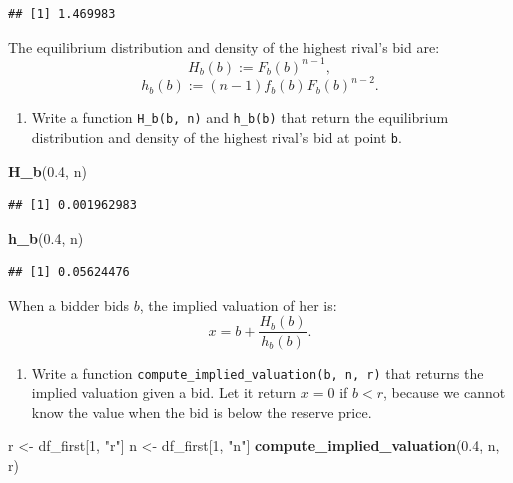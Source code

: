 \documentclass[]{book}
\newenvironment{Shaded}{\begin{snugshade}}{\end{snugshade}}
\newcommand{\KeywordTok}[1]{\textcolor[rgb]{0.13,0.29,0.53}{\textbf{#1}}}
\newcommand{\DecValTok}[1]{\textcolor[rgb]{0.00,0.00,0.81}{#1}}
\newcommand{\FloatTok}[1]{\textcolor[rgb]{0.00,0.00,0.81}{#1}}
\newcommand{\StringTok}[1]{\textcolor[rgb]{0.31,0.60,0.02}{#1}}
\newcommand{\NormalTok}[1]{#1}
\providecommand{\tightlist}{%
  \setlength{\itemsep}{0pt}\setlength{\parskip}{0pt}}
\begin{document}
\begin{verbatim}
## [1] 1.469983
\end{verbatim}

The equilibrium distribution and density of the highest rival's bid are:
\[
H_b(b) := F_b(b)^{n - 1},
\] \[
h_b(b) := (n - 1) f_b(b) F_b(b)^{n - 2}.
\]

\begin{enumerate}
\def\labelenumi{\arabic{enumi}.}
\setcounter{enumi}{10}
\tightlist
\item
  Write a function \texttt{H\_b(b,\ n)} and \texttt{h\_b(b)} that return
  the equilibrium distribution and density of the highest rival's bid at
  point \texttt{b}.
\end{enumerate}

\begin{Shaded}
\begin{Highlighting}[]
\KeywordTok{H_b}\NormalTok{(}\FloatTok{0.4}\NormalTok{, n)}
\end{Highlighting}
\end{Shaded}

\begin{verbatim}
## [1] 0.001962983
\end{verbatim}

\begin{Shaded}
\begin{Highlighting}[]
\KeywordTok{h_b}\NormalTok{(}\FloatTok{0.4}\NormalTok{, n)}
\end{Highlighting}
\end{Shaded}

\begin{verbatim}
## [1] 0.05624476
\end{verbatim}

When a bidder bids \(b\), the implied valuation of her is: \[
x = b + \frac{H_b(b)}{h_b(b)}.
\]

\begin{enumerate}
\def\labelenumi{\arabic{enumi}.}
\setcounter{enumi}{11}
\tightlist
\item
  Write a function \texttt{compute\_implied\_valuation(b,\ n,\ r)} that
  returns the implied valuation given a bid. Let it return \(x = 0\) if
  \(b < r\), because we cannot know the value when the bid is below the
  reserve price.
\end{enumerate}

\begin{Shaded}
\begin{Highlighting}[]
\NormalTok{r <-}\StringTok{ }\NormalTok{df_first[}\DecValTok{1}\NormalTok{, }\StringTok{"r"}\NormalTok{]}
\NormalTok{n <-}\StringTok{ }\NormalTok{df_first[}\DecValTok{1}\NormalTok{, }\StringTok{"n"}\NormalTok{]}
\KeywordTok{compute_implied_valuation}\NormalTok{(}\FloatTok{0.4}\NormalTok{, n, r)}
\end{Highlighting}
\end{Shaded}
\end{document}
